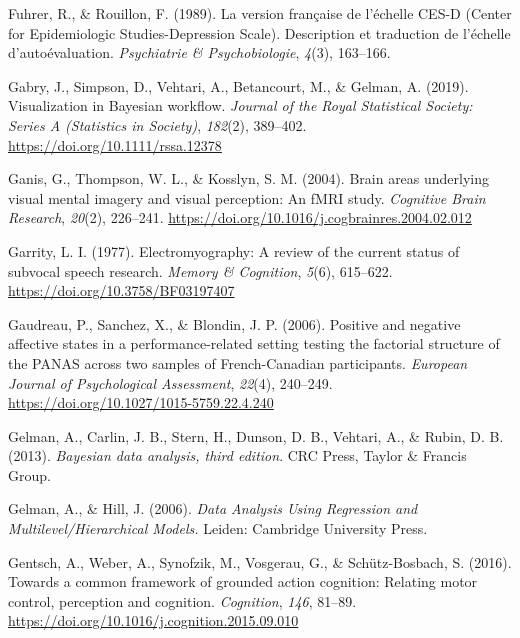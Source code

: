 \documentclass[a4paper,12pt,twoside,openright,oldfontcommands]{memoir}
\begin{document}
\leavevmode\hypertarget{ref-fuhrer_version_1989}{}%
Fuhrer, R., \& Rouillon, F. (1989). La version française de l'échelle CES-D (Center for Epidemiologic Studies-Depression Scale). Description et traduction de l'échelle d'autoévaluation. \emph{Psychiatrie \& Psychobiologie}, \emph{4}(3), 163--166.

\leavevmode\hypertarget{ref-gabry_visualization_2019}{}%
Gabry, J., Simpson, D., Vehtari, A., Betancourt, M., \& Gelman, A. (2019). Visualization in Bayesian workﬂow. \emph{Journal of the Royal Statistical Society: Series A (Statistics in Society)}, \emph{182}(2), 389--402. \url{https://doi.org/10.1111/rssa.12378}

\leavevmode\hypertarget{ref-ganis_brain_2004}{}%
Ganis, G., Thompson, W. L., \& Kosslyn, S. M. (2004). Brain areas underlying visual mental imagery and visual perception: An fMRI study. \emph{Cognitive Brain Research}, \emph{20}(2), 226--241. \url{https://doi.org/10.1016/j.cogbrainres.2004.02.012}

\leavevmode\hypertarget{ref-garrity_electromyography:_1977}{}%
Garrity, L. I. (1977). Electromyography: A review of the current status of subvocal speech research. \emph{Memory \& Cognition}, \emph{5}(6), 615--622. \url{https://doi.org/10.3758/BF03197407}

\leavevmode\hypertarget{ref-Gaudreau2006}{}%
Gaudreau, P., Sanchez, X., \& Blondin, J. P. (2006). Positive and negative affective states in a performance-related setting testing the factorial structure of the PANAS across two samples of French-Canadian participants. \emph{European Journal of Psychological Assessment}, \emph{22}(4), 240--249. \url{https://doi.org/10.1027/1015-5759.22.4.240}

\leavevmode\hypertarget{ref-gelman_bayesian_2013}{}%
Gelman, A., Carlin, J. B., Stern, H., Dunson, D. B., Vehtari, A., \& Rubin, D. B. (2013). \emph{Bayesian data analysis, third edition}. CRC Press, Taylor \& Francis Group.

\leavevmode\hypertarget{ref-gelman_data_2006}{}%
Gelman, A., \& Hill, J. (2006). \emph{Data Analysis Using Regression and Multilevel/Hierarchical Models.} Leiden: Cambridge University Press.

\leavevmode\hypertarget{ref-gentsch_towards_2016}{}%
Gentsch, A., Weber, A., Synofzik, M., Vosgerau, G., \& Schütz-Bosbach, S. (2016). Towards a common framework of grounded action cognition: Relating motor control, perception and cognition. \emph{Cognition}, \emph{146}, 81--89. \url{https://doi.org/10.1016/j.cognition.2015.09.010}
\end{document}
